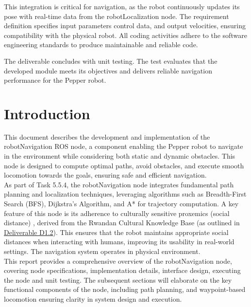 \documentclass{CSSRforAfrica}
\begin{document}
\noindent This integration is critical for navigation, as the robot continuously updates its pose with real-time data from the robotLocalization node. The requirement definition specifies input parameters  control data, and output velocities, ensuring compatibility with the physical robot. All coding activities adhere to the software engineering standards to produce maintainable and reliable code.

\noindent The deliverable concludes with unit testing. The test evaluates that the developed module meets its objectives and delivers reliable navigation performance for the Pepper robot.


\newpage
\pagebreak
\tableofcontents
\newpage

\section{Introduction}
This document describes the development and implementation of the robotNavigation ROS node, a component enabling the Pepper robot to navigate in the environment while considering both static and dynamic obstacles. This node is designed to compute optimal paths, avoid obstacles, and execute smooth locomotion towards the goals, ensuring safe and efficient navigation. \\

\noindent As part of Task 5.5.4, the robotNavigation node integrates fundamental path planning and localization techniques, leveraging algorithms such as Breadth-First Search (BFS), Dijkstra’s Algorithm, and A* for trajectory computation. A key feature of this node is its adherence to culturally sensitive proxemics (social distance) , derived from the Rwandan Cultural Knowledge Base (as outlined in \href{https://cssr4africa.github.io/deliverables/CSSR4Africa_Deliverable_D1.2.pdf}{Deliverable D1.2}). This ensures that the robot maintains appropriate social distances when interacting with humans, improving its usability in real-world settings. The navigation system operates in physical environment.\\

\noindent This report provides a comprehensive overview of the robotNavigation node, covering node specifications, implementation details, interface design, executing the node and unit testing. The subsequent sections will elaborate on the key functional components of the node, including path planning, and waypoint-based locomotion ensuring clarity in system design and execution.
\end{document}
